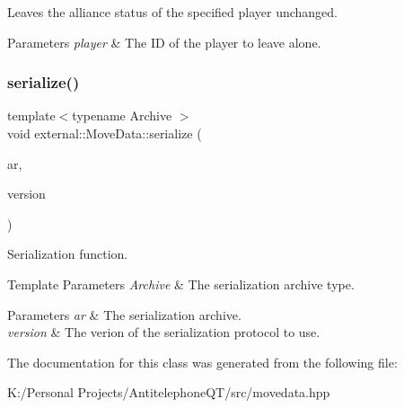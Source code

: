 Leaves the alliance status of the specified player unchanged. 


\begin{DoxyParams}{Parameters}
{\em player} & The ID of the player to leave alone. \\
\hline
\end{DoxyParams}
\mbox{\label{classexternal_1_1_move_data_afd1bb4302c0f725033149887c232af1a}} 
\subsubsection{\texorpdfstring{serialize()}{serialize()}}
{\footnotesize\ttfamily template$<$typename Archive $>$ \\
void external\+::\+Move\+Data\+::serialize (\begin{DoxyParamCaption}\item[{Archive \&}]{ar,  }\item[{unsigned int const}]{version }\end{DoxyParamCaption})\hspace{0.3cm}{\ttfamily [inline]}}



Serialization function. 


\begin{DoxyTemplParams}{Template Parameters}
{\em Archive} & The serialization archive type. \\
\hline
\end{DoxyTemplParams}

\begin{DoxyParams}{Parameters}
{\em ar} & The serialization archive. \\
\hline
{\em version} & The verion of the serialization protocol to use. \\
\hline
\end{DoxyParams}


The documentation for this class was generated from the following file\+:\begin{DoxyCompactItemize}
\item 
K\+:/\+Personal Projects/\+Antitelephone\+Q\+T/src/movedata.\+hpp\end{DoxyCompactItemize}
